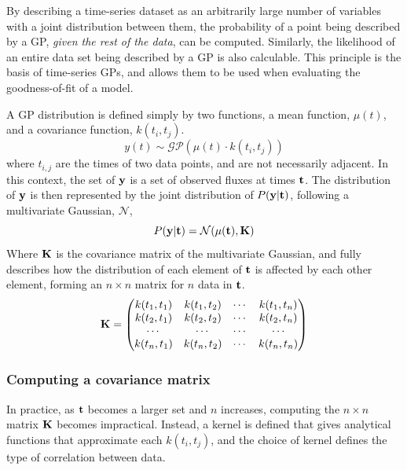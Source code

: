 By describing a time-series dataset as an arbitrarily large number of variables with a joint distribution between them, the probability of a point being described by a GP, \textit{given the rest of the data}, can be computed. Similarly, the likelihood of an entire data set being described by a GP is also calculable. This principle is the basis of time-series GPs, and allows them to be used when evaluating the goodness-of-fit of a model.

A GP distribution is defined simply by two functions, a mean function, $\mu(t)$, and a covariance function, $k(t_i, t_j)$.
\begin{equation}
    y(t) \sim \mathcal{GP}(\mu(t) \cdot k(t_i, t_j))
\end{equation}
where $t_{i, j}$ are the times of two data points, and are not necessarily adjacent. In this context, the set of $\bf y$ is a set of observed fluxes at times $\bf t$. The distribution of $\bf y$ is then represented by the joint distribution of $P({\bf y} | {\bf t})$, following a multivariate Gaussian, $\mathcal{N}$,
\begin{equation}
    P({\bf y} | {\bf t}) = \mathcal{N}(\mu({\bf t}), {\bf K})
\end{equation}
Where $\bf K$ is the covariance matrix of the multivariate Gaussian, and fully describes how the distribution of each element of $\bf t$ is affected by each other element, forming an $n \times n$ matrix for $n$ data in $\bf t$.
\begin{equation}
    {\bf K} =   \begin{pmatrix}
        k(t_1, t_1) & k(t_1, t_2) & \cdots & k(t_1, t_n) \\
        k(t_2, t_1) & k(t_2, t_2) & \cdots & k(t_2, t_n) \\
        \cdots      & \cdots      & \cdots & \cdots      \\
        k(t_n, t_1) & k(t_n, t_2) & \cdots & k(t_n, t_n) \\
            \end{pmatrix}
\end{equation}

\subsubsection{Computing a covariance matrix}
\label{sect:modelling:GP Kernel choice}

In practice, as $\bf t$ becomes a larger set and $n$ increases, computing the $n \times n$ matrix $\bf K$ becomes impractical. Instead, a kernel is defined that gives analytical functions that approximate each $k(t_i, t_j)$, and the choice of kernel defines the type of correlation between data.


